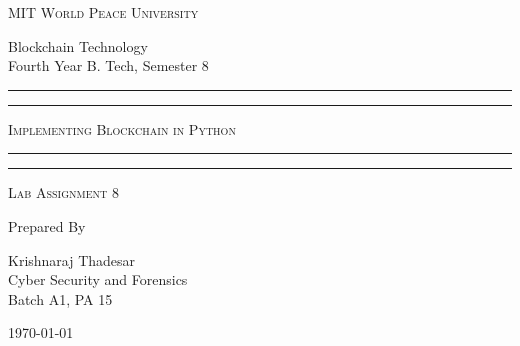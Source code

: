 \documentclass[11pt]{article}
\begin{document}
\begin{titlepage}
	\centering


	\huge\textsc{
		MIT World Peace University
	}\\

	\vspace{0.75\baselineskip} %

	\LARGE{
		Blockchain Technology\\
		Fourth Year B. Tech, Semester 8
	}

	\vfill %


	\rule{\textwidth}{1.6pt}\vspace*{-\baselineskip}\vspace*{2pt}
	\rule{\textwidth}{0.6pt}
	\vspace{0.75\baselineskip} %

	\huge{\textsc{
			Implementing Blockchain in Python
		}} \\

	\vspace{0.5\baselineskip} %
	\rule{\textwidth}{0.6pt}\vspace*{-\baselineskip}\vspace*{2.8pt}
	\rule{\textwidth}{1.6pt}

	\vspace{1\baselineskip} %


	\LARGE\textsc{
		Lab Assignment 8
	} %
	\vfill


	Prepared By \vspace{0.5\baselineskip} %

	\Large{
		Krishnaraj Thadesar \\
		Cyber Security and Forensics\\
		Batch A1, PA 15
	}

	\vspace{0.5\baselineskip} %
	\today

\end{titlepage}
\end{document}
